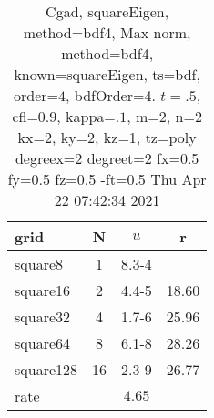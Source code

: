 \begin{table}[H]\tableFont %
\begin{center}
\begin{tabular}{|l|c|c|c|} \hline 
grid  & N &  $ u $ & r \\ \hline 
   square8 &     1 & \num{8.3}{-4} &        \\ \hline
  square16 &     2 & \num{4.4}{-5} & 18.60  \\ \hline
  square32 &     4 & \num{1.7}{-6} & 25.96  \\ \hline
  square64 &     8 & \num{6.1}{-8} & 28.26  \\ \hline
 square128 &    16 & \num{2.3}{-9} & 26.77  \\ \hline
    rate             &       &  $4.65$       &       \\ \hline
\end{tabular}
\caption{Cgad, squareEigen, method=bdf4, Max norm, method=bdf4, known=squareEigen, ts=bdf, order=$4$, bdfOrder=4. $t=.5$, cfl=$0.9$, kappa=$.1$, m=2, n=2 kx=2, ky=2, kz=1,  tz=poly degreex=2 degreet=2 fx=0.5 fy=0.5 fz=0.5 -ft=0.5 Thu Apr 22 07:42:34 2021}\label{table:squareEigenbdf4Order4Max}
\end{center}
\end{table}
